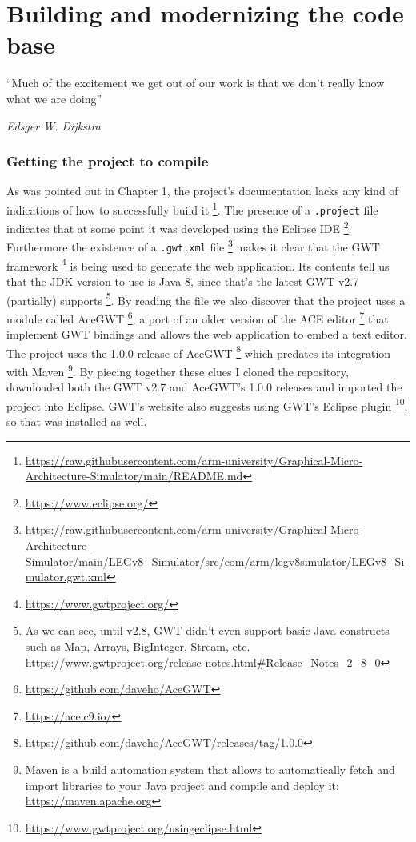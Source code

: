 \chapter{Building and modernizing the code base}\label{chap:sit}

\epigraph{``Much of the excitement we get out of our work is that we don't really know what we are doing''}{\textit{Edsger W. Dijkstra}}

\subsection*{Getting the project to compile}

As was pointed out in Chapter 1, the project's documentation lacks any kind of indications of how to successfully build it \footnote{\url{https://raw.githubusercontent.com/arm-university/Graphical-Micro-Architecture-Simulator/main/README.md}}.
The presence of a \verb|.project| file indicates that at some point it was developed using the Eclipse IDE \footnote{\url{https://www.eclipse.org/}}. Furthermore the existence of a \verb|.gwt.xml| file \footnote{\url{https://raw.githubusercontent.com/arm-university/Graphical-Micro-Architecture-Simulator/main/LEGv8_Simulator/src/com/arm/legv8simulator/LEGv8_Simulator.gwt.xml}} makes it clear that the GWT framework \footnote{\url{https://www.gwtproject.org/}} is being used to generate the web application. Its contents tell us that the JDK version to use is Java 8, since that's the latest GWT v2.7 (partially) supports \footnote{As we can see, until v2.8, GWT didn't even support basic Java constructs such as Map, Arrays, BigInteger, Stream, etc. \url{https://www.gwtproject.org/release-notes.html#Release_Notes_2_8_0}}. By reading the file we also discover that the project uses a module called AceGWT \footnote{\url{https://github.com/daveho/AceGWT}}, a port of an older version of the ACE editor \footnote{\url{https://ace.c9.io/}} that implement GWT bindings and allows the web application to embed a text editor. The project uses the 1.0.0 release of AceGWT \footnote{\url{https://github.com/daveho/AceGWT/releases/tag/1.0.0}} which predates its integration with Maven \footnote{Maven is a build automation system that allows to automatically fetch and import libraries to your Java project and compile and deploy it: \url{https://maven.apache.org}}.
\newline
By piecing together these clues I cloned the repository, downloaded both the GWT v2.7 and AceGWT's 1.0.0 releases and imported the project into Eclipse. GWT's website also suggests using GWT's Eclipse plugin \footnote{\url{https://www.gwtproject.org/usingeclipse.html}}, so that was installed as well.
